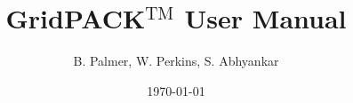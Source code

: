 \documentclass[12pt]{report}
\begin{document}
\title{GridPACK$\mathrm{{}^{TM}}$ User Manual}
\author{B. Palmer, W. Perkins, S. Abhyankar}
\date{\today}
\maketitle





\tableofcontents
\eject














































































\end{document}
